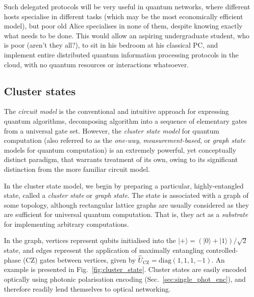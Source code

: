 \documentclass[aps,rmp,twocolumn,amsmath,amssymb,nofootinbib,superscriptaddress]{revtex4}
\newcommand{\ket}[1]{|#1\rangle}
\begin{document}
Such delegated protocols will be very useful in quantum networks, where different hosts specialise in different tasks (which may be the most economically efficient model), but poor old Alice specialises in none of them, despite knowing exactly what needs to be done. This would allow an aspiring undergraduate student, who is poor (aren't they all?), to sit in his bedroom at his classical PC, and implement entire distributed quantum information processing protocols in the cloud, with no quantum resources or interactions whatsoever.

%
%

\subsection{Cluster states} \label{sec:CSQC}

The \emph{circuit model} is the conventional and intuitive approach for expressing quantum algorithms, decomposing algorithm into a sequence of elementary gates from a universal gate set. However, the \emph{cluster state model} for quantum computation \cite{bib:Raussendorf01, bib:Raussendorf03, bib:Nielsen06} (also referred to as the \emph{one-way}, \emph{measurement-based}, or \emph{graph state} models for quantum computation) is an extremely powerful, yet conceptually distinct paradigm, that warrants treatment of its own, owing to its significant distinction from the more familiar circuit model.

In the cluster state model, we begin by preparing a particular, highly-entangled state, called a \emph{cluster state} or \emph{graph state}. The state is associated with a graph of some topology, although rectangular lattice graphs are usually considered as they are sufficient for universal quantum computation. That is, they act as a \emph{substrate} for implementing arbitrary computations.

In the graph, vertices represent qubits initialised into the \mbox{$\ket{+}=(\ket{0}+\ket{1})/\sqrt{2}$} state, and edges represent the application of maximally entangling controlled-phase (CZ) gates between vertices, given by \mbox{$\hat{U}_\mathrm{CZ}=\mathrm{diag}(1,1,1,-1)$}. An example is presented in Fig.~\ref{fig:cluster_state}. Cluster states are easily encoded optically using photonic polarisation encoding (Sec.~\ref{sec:single_phot_enc}), and therefore readily lend themselves to optical networking.
\end{document}
